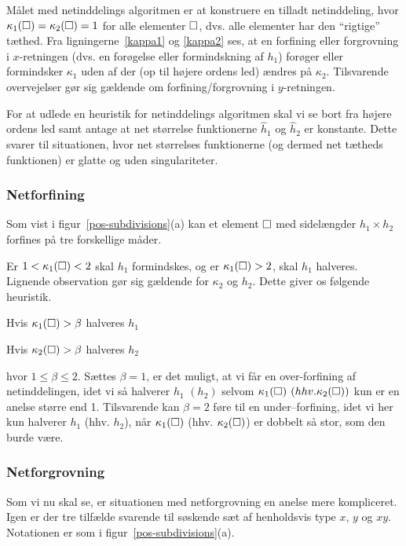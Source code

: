 Målet med netinddelings algoritmen er at konstruere en tilladt
netinddeling, hvor $\kappa_1(\Box)=\kappa_2(\Box)=1$ for alle elementer
$\Box$, dvs. alle elementer har den ``rigtige'' tæthed. Fra
ligningerne~\eqref{kappa1} og \eqref{kappa2} ses, at en forfining eller
forgrovning i $x$-retningen (dvs. en forøgelse eller formindskning af $h_1$)
forøger eller formindsker $\kappa_1$ uden af der (op til højere ordens led)
ændres på $\kappa_2$. Tilsvarende overvejelser gør sig gældende om
forfining/forgrovning i $y$-retningen. 

For at udlede en heuristik for netinddelings algoritmen skal vi se
bort fra højere ordens led samt antage at net størrelse funktionerne
$\hat{h}_1$ og $\hat{h}_2$ er konstante. Dette svarer til situationen,
hvor net størrelses funktionerne (og dermed net tætheds funktionen) er
glatte og uden singulariteter. 

\subsubsection{Netforfining} 
Som vist i figur~\ref{pos-subdivisions}(a) kan et element $\Box$ med
sidelængder $h_1\times h_2$ forfines på tre forskellige måder.  

Er $1<\kappa_1(\Box)<2$ skal $h_1$ formindskes, og er $\kappa_1(\Box)>2$, skal
$h_1$ halveres. Lignende observation gør sig gældende for $\kappa_2$
og $h_2$. Dette giver os følgende heuristik.
 \begin{ttitemize}
  \item  Hvis $\kappa_1(\Box)>\beta$ halveres $h_1$
  \item  Hvis $\kappa_2(\Box)>\beta$ halveres $h_2$   
\end{ttitemize}
hvor $1\leq\beta\leq 2$. Sættes $\beta =1$, er det muligt, at vi får
en over-forfining af netinddelingen, idet vi så halverer $h_1$ $(h_2)$
selvom $\kappa_1(\Box)$ $(hhv. \kappa_2(\Box))$ kun er en anelse større end
1. Tilsvarende kan $\beta =2$ føre til en under--forfining, idet vi her
kun halverer $h_1$ (hhv. $h_2$), når $\kappa_1(\Box)$ (hhv. $\kappa_2(\Box)$) er
dobbelt så stor, som den burde være.

\subsubsection{Netforgrovning}
Som vi nu skal se, er situationen med netforgrovning en anelse mere
kompliceret. Igen er der tre tilfælde svarende til søskende sæt af
henholdsvis type $x$, $y$ og $xy$. Notationen er som i
figur~\ref{pos-subdivisions}(a).  

